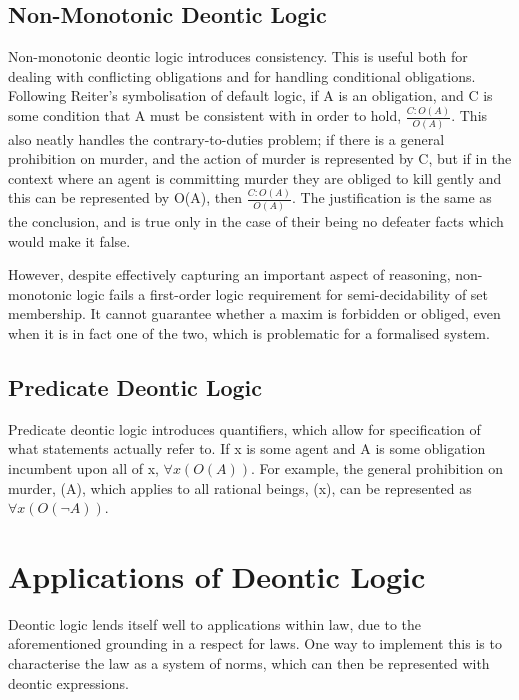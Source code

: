 \documentclass{l4proj}
\begin{document}
\subsection{Non-Monotonic Deontic Logic}%
Non-monotonic deontic logic introduces consistency\cite{Powers}. This is useful both for dealing with conflicting obligations and for handling conditional obligations\cite{Horty}. Following Reiter's symbolisation of default logic\cite{Reiter}, if A is an obligation, and C is some condition that A must be consistent with in order to hold, \( \frac{C : O(A)}{O(A)} \). This also neatly handles the contrary-to-duties problem; if there is a general prohibition on murder, and the action of murder is represented by C, but if in the context where an agent is committing murder they are obliged to kill gently and this can be represented by O(A), then \( \frac{C : O(A)}{O(A)} \). The justification is the same as the conclusion, and is true only in the case of their being no defeater facts which would make it false. 

However, despite effectively capturing an important aspect of reasoning, non-monotonic logic fails a first-order logic requirement for semi-decidability of set membership. It cannot guarantee whether a maxim is forbidden or obliged, even when it is in fact one of the two, which is problematic for a formalised system. 

\subsection{Predicate Deontic Logic}%
Predicate deontic logic\cite{predicate} introduces quantifiers, which allow for specification of what statements actually refer to. If x is some agent and A is some obligation incumbent upon all of x, \( \forall{x(O(A))} \). For example, the general prohibition on murder, (A), which applies to all rational beings, (x), can be represented as \( \forall{x(O(¬A))} \). 

\section{Applications of Deontic Logic}
Deontic logic lends itself well to applications within law, due to the aforementioned grounding in a respect for laws. One way to implement this is to characterise the law as a system of norms\cite{law-jonessergot}, which can then be represented with deontic expressions. 
\end{document}
